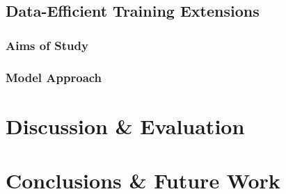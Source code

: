 \documentclass[a4paper, 11pt]{report}
\begin{document}
    \section{Data-Efficient Training Extensions}
    \label{section: data-extensions}

    \subsection{Aims of Study}


    \subsection{Model Approach}








    \newpage
    \chapter{Discussion \& Evaluation}
    \label{chapter: evaluation}

    \newpage
    \chapter{Conclusions \& Future Work}
    \label{chapter: conclusion}



    \newpage
    
\end{document}
